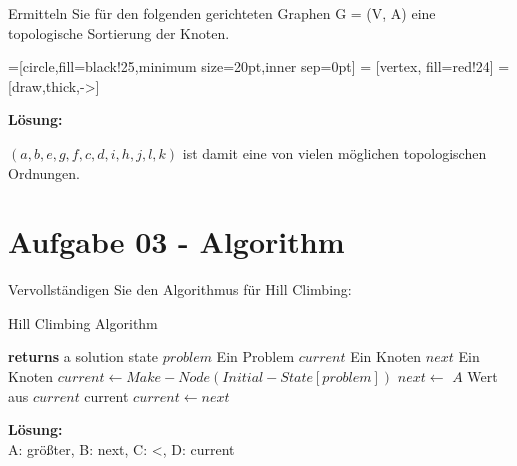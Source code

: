 \documentclass[fleqn]{article}
\numberwithin{equation}{section}
\numberwithin{figure}{section}
\numberwithin{table}{section}
\begin{document}
Ermitteln Sie für den folgenden gerichteten Graphen G = (V, A) eine topologische Sortierung der Knoten.\\
\bigskip

=[circle,fill=black!25,minimum size=20pt,inner sep=0pt]
 = [vertex, fill=red!24]
 = [draw,thick,->]


\textbf{Lösung:}\\
\bigskip

$(a, b, e, g, f, c, d, i, h, j, l, k)$ ist damit eine von vielen möglichen topologischen Ordnungen.

\section{Aufgabe 03 - Algorithm}

Vervollständigen Sie den Algorithmus für Hill Climbing:

\begin{algorithm}
\caption{Hill Climbing Algorithm}
\begin{algorithmic}[1]
 \State \textbf{returns} a solution state
\INPUT
\Statex $problem$ \Comment Ein Problem
\Statex $current$  \Comment Ein Knoten
\Statex $next$  \Comment Ein Knoten
\State $current \gets Make-Node(Initial-State[problem])$
\Loop
\State $next \gets$ $A$ Wert aus $current$
 \Return current
\EndIf
\State $current \gets next$
\EndLoop
\EndFunction
\end{algorithmic}
\end{algorithm}

\textbf{Lösung:}\\
\bigskip
A: größter, B: next, C: <, D: current
\end{document}
